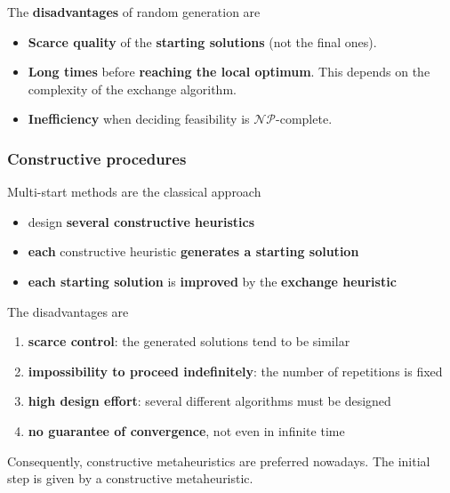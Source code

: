 The \textbf{disadvantages} of random generation are
\begin{itemize}
	\item \textbf{Scarce quality} of the \textbf{starting solutions} (not the final ones).\\
	
	\item \textbf{Long times} before \textbf{reaching the local optimum}. This depends on the complexity of the exchange algorithm.\\
	
	\item \textbf{Inefficiency} when deciding feasibility is $\mathcal{NP}$-complete.\\
\end{itemize}

\newpage

\subsubsection{Constructive procedures}

Multi-start methods are the classical approach
\begin{itemize}
	\item design \textbf{several constructive heuristics}
	\item \textbf{each} constructive heuristic \textbf{generates a starting solution}
	\item \textbf{each starting solution} is \textbf{improved} by the \textbf{exchange heuristic}
\end{itemize}

\nn

The disadvantages are
\begin{enumerate}
	\item \textbf{scarce control}: the generated solutions tend to be similar
	
	\item \textbf{impossibility to proceed indefinitely}: the number of repetitions is fixed
	
	\item \textbf{high design effort}: several different algorithms must be designed
	
	\item \textbf{no guarantee of convergence}, not even in infinite time
\end{enumerate}

Consequently, constructive metaheuristics are preferred nowadays. The initial step is given by a constructive metaheuristic. \\

